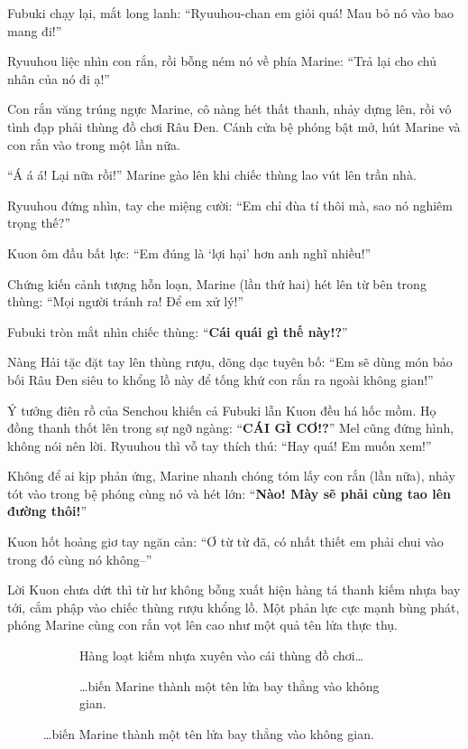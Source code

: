 \documentclass[../main.tex]{subfiles}
\begin{document}
Fubuki chạy lại, mắt long lanh: ``Ryuuhou-chan em giỏi quá! Mau bỏ nó vào bao mang đi!''

Ryuuhou liệc nhìn con rắn, rồi bỗng ném nó về phía Marine: ``Trả lại cho chủ nhân của nó đi ạ!''

Con rắn văng trúng ngực Marine, cô nàng hét thất thanh, nhảy dựng lên, rồi vô tình đạp phải thùng đồ chơi Râu Đen. Cánh cửa bệ phóng bật mở, hút Marine và con rắn vào trong một lần nữa.

``Á á á! Lại nữa rồi!'' Marine gào lên khi chiếc thùng lao vút lên trần nhà.

Ryuuhou đứng nhìn, tay che miệng cười: ``Em chỉ đùa tí thôi mà, sao nó nghiêm trọng thế?''

Kuon ôm đầu bất lực: ``Em đúng là `lợi hại' hơn anh nghĩ nhiều!''

\ct

Chứng kiến cảnh tượng hỗn loạn, Marine (lần thứ hai) hét lên từ bên trong thùng: ``Mọi người tránh ra! Để em xử lý!''

Fubuki tròn mắt nhìn chiếc thùng: ``\textbf{Cái quái gì thế này!?}''

Nàng Hải tặc đặt tay lên thùng rượu, dõng dạc tuyên bố: ``Em sẽ dùng món bảo bối Râu Đen siêu to khổng lồ này để tống khứ con rắn ra ngoài không gian!''

Ý tưởng điên rồ của Senchou khiến cả Fubuki lẫn Kuon đều há hốc mồm. Họ đồng thanh thốt lên trong sự ngỡ ngàng: ``\textbf{CÁI GÌ CƠ!?}'' Mel cũng đứng hình, không nói nên lời. Ryuuhou thì vỗ tay thích thú: ``Hay quá! Em muốn xem!''

Không để ai kịp phản ứng, Marine nhanh chóng tóm lấy con rắn (lần nữa), nhảy tót vào trong bệ phóng cùng nó và hét lớn: ``\textbf{Nào! Mày sẽ phải cùng tao lên đường thôi!}''

Kuon hốt hoảng giơ tay ngăn cản: ``Ơ từ từ đã, có nhất thiết em phải chui vào trong đó cùng nó không--''

Lời Kuon chưa dứt thì từ hư không bỗng xuất hiện hàng tá thanh kiếm nhựa bay tới, cắm phập vào chiếc thùng rượu khổng lồ. Một phản lực cực mạnh bùng phát, phóng Marine cùng con rắn vọt lên cao như một quả tên lửa thực thụ.

\begin{figure}[H]
  \centering
  \begin{subfigure}[t]{0.45\textwidth}
    \centering
    \caption{Hàng loạt kiếm nhựa xuyên vào cái thùng đồ chơi\dots}
  \end{subfigure}
  \quad
  \begin{subfigure}[t]{0.45\textwidth}
    \centering
    \caption{\dots biến Marine thành một tên lửa bay thẳng vào không gian.}
  \end{subfigure}
\end{figure}
\end{document}

